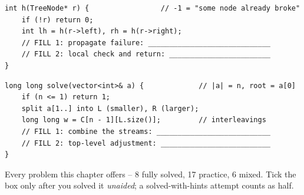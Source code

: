 \begin{lstlisting}[caption={Drill 3 -- sentinel early-abort (from \coderef{c01-balanced})}]
int h(TreeNode* r) {                 // -1 = "some node already broke"
    if (!r) return 0;
    int lh = h(r->left), rh = h(r->right);
    // FILL 1: propagate failure: _____________________________
    // FILL 2: local check and return: ________________________
}
\end{lstlisting}

\begin{lstlisting}[caption={Drill 4 -- mod-safe counting (from \coderef{c01-reorder-bst})}]
long long solve(vector<int>& a) {             // |a| = n, root = a[0]
    if (n <= 1) return 1;
    split a[1..] into L (smaller), R (larger);
    long long w = C[n - 1][L.size()];         // interleavings
    // FILL 1: combine the streams: ___________________________
    // FILL 2: top-level adjustment: __________________________
}
\end{lstlisting}


Every problem this chapter offers -- 8 fully solved, 17 practice, 6 mixed. Tick the box
only after you solved it \emph{unaided}; a solved-with-hints attempt counts as half.

